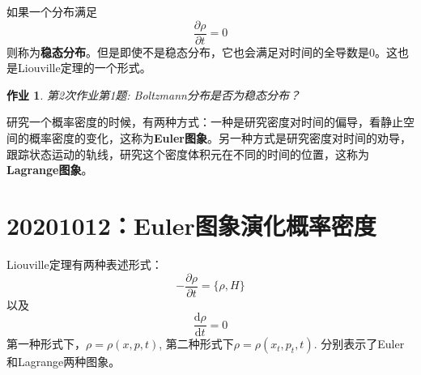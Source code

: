 \documentclass[12pt]{article}
\newtheorem{asg}{作业}
\begin{document}
    如果一个分布满足
    \begin{equation*}
        \frac {\partial \rho}{\partial t} = 0
    \end{equation*}
    则称为\textbf{稳态分布}。但是即使不是稳态分布，它也会满足对时间的全导数是0。这也是Liouville定理的一个形式。
    \begin{asg}
        第2次作业第1题: Boltzmann分布是否为稳态分布？
    \end{asg}

    研究一个概率密度的时候，有两种方式：一种是研究密度对时间的偏导，看静止空间的概率密度的变化，这称为\textbf{Euler图象}。另一种方式是研究密度对时间的劝导，跟踪状态运动的轨线，研究这个密度体积元在不同的时间的位置，这称为\textbf{Lagrange图象}。

\section{20201012：Euler图象演化概率密度}

    Liouville定理有两种表述形式：
    \begin{equation*}
        -\frac {\partial \rho}{\partial t} = \{ \rho,H \}
    \end{equation*}
    以及 
    \begin{equation*}
        \frac {\mathrm{d}\rho}{\mathrm{d}t} = 0
    \end{equation*}
    第一种形式下，$\rho = \rho(x, p ,t)$, 第二种形式下$\rho = \rho(x_t,p_t,t)$. 分别表示了Euler和Lagrange两种图象。
\end{document}
